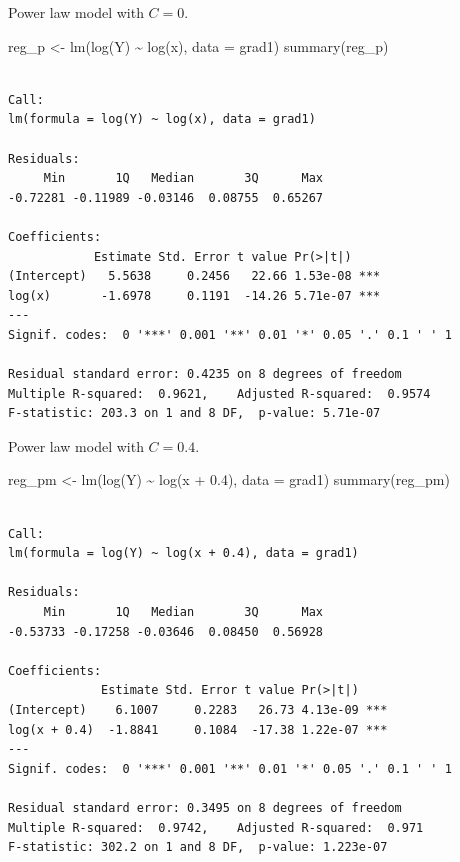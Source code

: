 \documentclass[
  letterpaper,
  DIV=11,
  numbers=noendperiod]{scrreprt}
\newenvironment{Shaded}{\begin{snugshade}}{\end{snugshade}}
\newcommand{\AttributeTok}[1]{\textcolor[rgb]{0.40,0.45,0.13}{#1}}
\newcommand{\FloatTok}[1]{\textcolor[rgb]{0.68,0.00,0.00}{#1}}
\newcommand{\FunctionTok}[1]{\textcolor[rgb]{0.28,0.35,0.67}{#1}}
\newcommand{\NormalTok}[1]{\textcolor[rgb]{0.00,0.23,0.31}{#1}}
\newcommand{\OtherTok}[1]{\textcolor[rgb]{0.00,0.23,0.31}{#1}}
\newcommand{\SpecialCharTok}[1]{\textcolor[rgb]{0.37,0.37,0.37}{#1}}
\begin{document}
Power law model with \(C = 0\).

\begin{Shaded}
\begin{Highlighting}[]
\NormalTok{reg\_p }\OtherTok{\textless{}{-}} \FunctionTok{lm}\NormalTok{(}\FunctionTok{log}\NormalTok{(Y) }\SpecialCharTok{\textasciitilde{}} \FunctionTok{log}\NormalTok{(x), }\AttributeTok{data =}\NormalTok{ grad1)}
\FunctionTok{summary}\NormalTok{(reg\_p)}
\end{Highlighting}
\end{Shaded}

\begin{verbatim}

Call:
lm(formula = log(Y) ~ log(x), data = grad1)

Residuals:
     Min       1Q   Median       3Q      Max 
-0.72281 -0.11989 -0.03146  0.08755  0.65267 

Coefficients:
            Estimate Std. Error t value Pr(>|t|)    
(Intercept)   5.5638     0.2456   22.66 1.53e-08 ***
log(x)       -1.6978     0.1191  -14.26 5.71e-07 ***
---
Signif. codes:  0 '***' 0.001 '**' 0.01 '*' 0.05 '.' 0.1 ' ' 1

Residual standard error: 0.4235 on 8 degrees of freedom
Multiple R-squared:  0.9621,    Adjusted R-squared:  0.9574 
F-statistic: 203.3 on 1 and 8 DF,  p-value: 5.71e-07
\end{verbatim}

Power law model with \(C = 0.4\).

\begin{Shaded}
\begin{Highlighting}[]
\NormalTok{reg\_pm }\OtherTok{\textless{}{-}} \FunctionTok{lm}\NormalTok{(}\FunctionTok{log}\NormalTok{(Y) }\SpecialCharTok{\textasciitilde{}} \FunctionTok{log}\NormalTok{(x }\SpecialCharTok{+} \FloatTok{0.4}\NormalTok{), }\AttributeTok{data =}\NormalTok{ grad1)}
\FunctionTok{summary}\NormalTok{(reg\_pm)}
\end{Highlighting}
\end{Shaded}

\begin{verbatim}

Call:
lm(formula = log(Y) ~ log(x + 0.4), data = grad1)

Residuals:
     Min       1Q   Median       3Q      Max 
-0.53733 -0.17258 -0.03646  0.08450  0.56928 

Coefficients:
             Estimate Std. Error t value Pr(>|t|)    
(Intercept)    6.1007     0.2283   26.73 4.13e-09 ***
log(x + 0.4)  -1.8841     0.1084  -17.38 1.22e-07 ***
---
Signif. codes:  0 '***' 0.001 '**' 0.01 '*' 0.05 '.' 0.1 ' ' 1

Residual standard error: 0.3495 on 8 degrees of freedom
Multiple R-squared:  0.9742,    Adjusted R-squared:  0.971 
F-statistic: 302.2 on 1 and 8 DF,  p-value: 1.223e-07
\end{verbatim}
\end{document}
